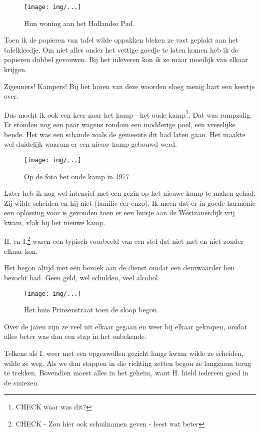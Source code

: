 \documentclass[10pt,twoside,openright]{memoir}
\begin{document}
\begin{figure}[t]
\texttt{[image: img/...]}
\caption{Hun woning aan het Hollandse Pad.}
\end{figure}

Toen ik de papieren van tafel wilde oppakken bleken ze vast geplakt aan het tafelkleedje. Om niet alles onder het vettige goedje te laten komen heb ik de papieren dubbel gevouwen. Bij het inleveren kon ik ze maar moeilijk van elkaar krijgen.	

Zigeuners! Kampers! Bij het horen van deze woorden sloeg menig hart een keertje over. 

Dus mocht ik ook een keer naar het kamp---het oude kamp\footnote{CHECK waar was dit?}. Dat was rampzalig. Er stonden nog een paar wagens rondom een modderige poel, een vreselijke bende. Het was een schande zoals de gemeente dit had laten gaan. Het maakte wel duidelijk waarom er een nieuw kamp gebouwd werd. 

\begin{figure}[t]
\texttt{[image: img/...]}
\caption{Op de foto het oude kamp in 1977}
\end{figure}

Later heb ik nog wel intensief met een gezin op het nieuwe kamp te maken gehad. Zij wilde scheiden en hij niet (familie-eer enzo). Ik meen dat er in goede harmonie een oplossing voor is gevonden toen er een huisje aan de Westzanerdijk vrij kwam, vlak bij het nieuwe kamp. 

H. en I.\footnote{CHECK - Zou hier ook schuilnamen geven - leest wat beter} waren een typisch voorbeeld van een stel dat niet met en niet zonder elkaar kon. 

Het begon altijd met een bezoek aan de dienst omdat een deurwaarder hen bezocht had. Geen geld, wel schulden, veel alcohol.

\begin{figure}[t]
\texttt{[image: img/...]}
\caption{Het huis Prinsenstraat toen de sloop begon.}
\end{figure}

Over de jaren zijn ze veel uit elkaar gegaan en weer bij elkaar gekropen, omdat alles beter was dan een stap in het onbekende. 

Telkens als I. weer met een opgezwollen gezicht langs kwam wilde ze scheiden, wilde ze weg. Als we dan stappen in die richting zetten begon ze langzaam terug te trekken. Bovendien moest alles in het geheim, want H. hield iedereen goed in de smiezen. 
\end{document}
